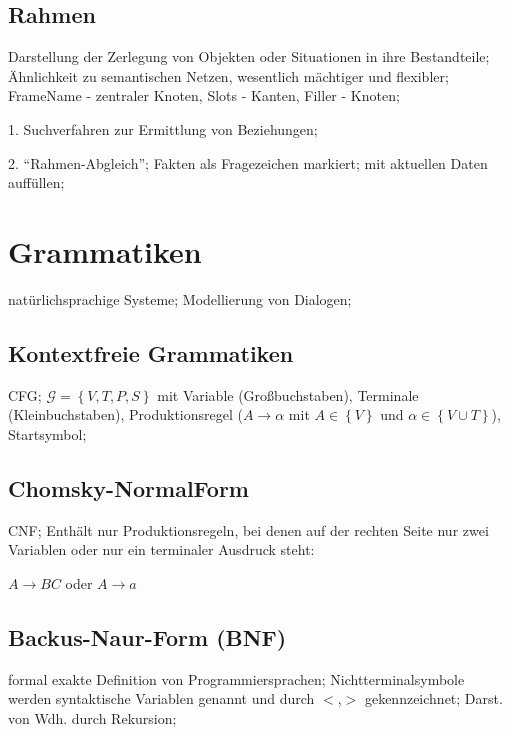 \documentclass[german,color,6pt]{latex4ei/latex4ei_sheet}
\begin{document}
\begin{sectionbox}
\subsection{Rahmen}
Darstellung der Zerlegung von Objekten oder Situationen in ihre Bestandteile; Ähnlichkeit zu semantischen Netzen, wesentlich mächtiger und flexibler; FrameName - zentraler Knoten, Slots - Kanten, Filler - Knoten;

1. Suchverfahren zur Ermittlung von Beziehungen;

2. "`Rahmen-Abgleich"'; Fakten als Fragezeichen markiert; mit aktuellen Daten auffüllen;
\end{sectionbox}


\section{Grammatiken}
\begin{symbolbox}
natürlichsprachige Systeme; Modellierung von Dialogen;
\end{symbolbox}

\begin{sectionbox}
\subsection{Kontextfreie Grammatiken}
CFG; $ \mathcal G = \left\{ V, T, P, S \right\} $ mit Variable (Großbuchstaben), Terminale (Kleinbuchstaben), Produktionsregel ($A \rightarrow \alpha $ mit $A \in \left\{V \right\}$ und $\alpha \in \left\{ V \cup T \right\} $), Startsymbol;
\end{sectionbox}

\begin{sectionbox}
\subsection{Chomsky-NormalForm}
CNF; Enthält nur Produktionsregeln, bei denen auf der rechten Seite nur zwei Variablen oder nur ein terminaler Ausdruck steht:

\begin{emphbox}
	$A \rightarrow BC$ oder $A \rightarrow a$
\end{emphbox}
\end{sectionbox}

\begin{sectionbox}
\subsection{Backus-Naur-Form (BNF)}
formal exakte Definition von Programmiersprachen; Nichtterminalsymbole werden syntaktische Variablen genannt und durch $<$,$ >$ gekennzeichnet; Darst. von Wdh. durch Rekursion;
\end{sectionbox}
\end{document}
